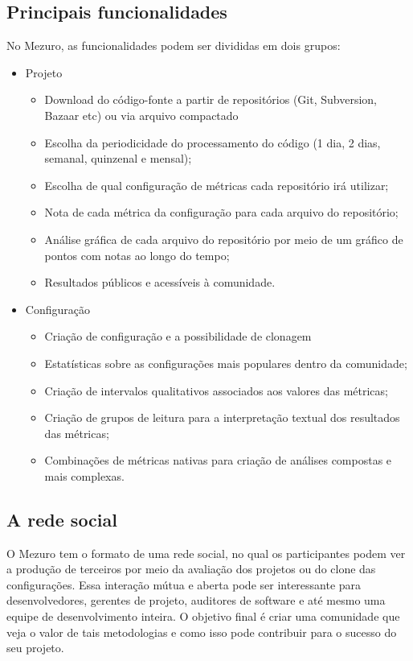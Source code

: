 \documentclass[12pt]{article}
\begin{document}
  \subsection{Principais funcionalidades}\label{sec:princ-funcionalidades}
  No Mezuro, as funcionalidades podem ser divididas em dois grupos:
  \begin{itemize}
    \item Projeto
      \begin{itemize}
      \item Download do código-fonte a partir de repositórios (Git, Subversion, Bazaar etc) ou via arquivo compactado
          \item Escolha da periodicidade do processamento do código (1 dia, 2 dias, semanal, quinzenal e mensal);
          \item Escolha de qual configuração de métricas cada repositório irá utilizar;
          \item Nota de cada métrica da configuração para cada arquivo do repositório;
          \item Análise gráfica de cada arquivo do repositório por meio de um gráfico de pontos com notas ao longo do tempo;
          \item Resultados públicos e acessíveis à comunidade.
      \end{itemize}
      \item Configuração
      \begin{itemize}
      \item Criação de configuração e a possibilidade de clonagem
          \item Estatísticas sobre as configurações mais populares dentro da comunidade;
          \item Criação de intervalos qualitativos associados aos valores das métricas;
          \item Criação de grupos de leitura para a interpretação textual dos resultados das métricas;
          \item Combinações de métricas nativas para criação de análises compostas e mais complexas.
      \end{itemize}
  \end{itemize}

  \subsection{A rede social}\label{sec:user-potencial}
  O Mezuro tem o formato de uma rede social, no qual os participantes podem ver a produção de terceiros por meio da avaliação dos projetos ou do clone das configurações. Essa interação mútua e aberta pode ser interessante para desenvolvedores, gerentes de projeto, auditores de software e até mesmo uma equipe de desenvolvimento inteira. O objetivo final é criar uma comunidade que veja o valor de tais metodologias e como isso pode contribuir para o sucesso do seu projeto.
\end{document}
